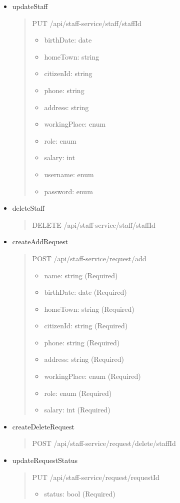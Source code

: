\begin{itemize}
	\item updateStaff
	      \begin{quote}
		      PUT /api/staff-service/staff/{staffId}
		      \begin{itemize}
			      \item birthDate: date
			      \item homeTown: string
			      \item citizenId: string
			      \item phone: string
			      \item address: string
			      \item workingPlace: enum
			      \item role: enum
			      \item salary: int
			      \item username: enum
			      \item password: enum
		      \end{itemize}
	      \end{quote}

	\item deleteStaff
	      \begin{quote}
		      DELETE /api/staff-service/staff/{staffId}
	      \end{quote}

	\item createAddRequest
	      \begin{quote}
		      POST /api/staff-service/request/add
		      \begin{itemize}
			      \item name: string (Required)
			      \item birthDate: date (Required)
			      \item homeTown: string (Required)
			      \item citizenId: string (Required)
			      \item phone: string (Required)
			      \item address: string (Required)
			      \item workingPlace: enum (Required)
			      \item role: enum (Required)
			      \item salary: int (Required)
		      \end{itemize}
	      \end{quote}

	\item createDeleteRequest
	      \begin{quote}
		      POST /api/staff-service/request/delete/{staffId}
	      \end{quote}

	\item updateRequestStatus
	      \begin{quote}
		      PUT /api/staff-service/request/{requestId}
		      \begin{itemize}
			      \item status: bool (Required)
		      \end{itemize}
	      \end{quote}

\end{itemize}

